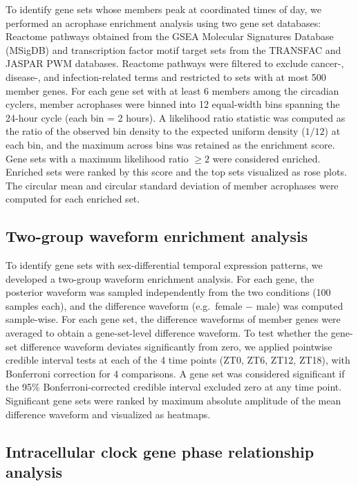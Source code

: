 \documentclass[12pt]{article}
\begin{document}
To identify gene sets whose members peak at coordinated times of day, we performed an acrophase
enrichment analysis using two gene set databases: Reactome pathways obtained from the GSEA Molecular
Signatures Database (MSigDB) and transcription factor motif target sets from the TRANSFAC and JASPAR
PWM databases. Reactome pathways were filtered to exclude cancer-, disease-, and infection-related
terms and restricted to sets with at most 500 member genes. For each gene set with at least 6
members among the circadian cyclers, member acrophases were binned into 12 equal-width bins
spanning the 24-hour cycle (each bin = 2 hours). A likelihood ratio statistic was computed as the
ratio of the observed bin density to the expected uniform density ($1/12$) at each bin, and the
maximum across bins was retained as the enrichment score. Gene sets with a maximum likelihood ratio
$\geq 2$ were considered enriched. Enriched sets were ranked by this score and the top sets
visualized as rose plots. The circular mean and circular standard deviation of member acrophases were
computed for each enriched set.

\subsection*{Two-group waveform enrichment analysis}

To identify gene sets with sex-differential temporal expression patterns, we developed a two-group
waveform enrichment analysis. For each gene, the posterior waveform was sampled independently from
the two conditions (100 samples each), and the difference waveform (e.g.\ female $-$ male) was
computed sample-wise. For each gene set, the difference waveforms of member genes were averaged to
obtain a gene-set-level difference waveform. To test whether the gene-set difference waveform
deviates significantly from zero, we applied pointwise credible interval tests at each of the 4 time
points (ZT0, ZT6, ZT12, ZT18), with Bonferroni correction for 4 comparisons. A gene set was
considered significant if the 95\% Bonferroni-corrected credible interval excluded zero at any time
point. Significant gene sets were ranked by maximum absolute amplitude of the mean difference
waveform and visualized as heatmaps.

\subsection*{Intracellular clock gene phase relationship analysis}
\end{document}
